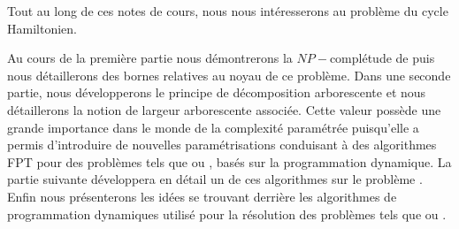 Tout au long de ces notes de cours, nous nous intéresserons au problème du cycle Hamiltonien. 

Au cours de la première partie nous démontrerons la $NP-$complétude de \hcycle puis nous
détaillerons des bornes relatives au noyau de ce problème. Dans une seconde partie, nous développerons le
principe de décomposition arborescente et nous détaillerons la notion de largeur arborescente
associée. Cette valeur possède une grande importance dans le monde de la complexité paramétrée
puisqu'elle a permis d'introduire de nouvelles paramétrisations conduisant à des algorithmes FPT
pour des problèmes tels que \wiset ou \hcycle, basés sur la programmation dynamique. La partie
suivante développera en détail un de ces algorithmes sur le problème \hcycle. Enfin nous
présenterons les idées se trouvant derrière les algorithmes de programmation dynamiques utilisé pour
la résolution des problèmes tels que \wiset ou \fvset. 

